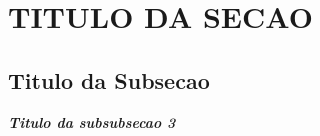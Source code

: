 \section{TITULO DA SECAO}\label{sec:conteudo3}
\blindtext

\subsection{Titulo da Subsecao}\label{subsec:conteudo3}
\blindtext

\noindent\textbf{\textit{Titulo da subsubsecao 3}}

\blindtext